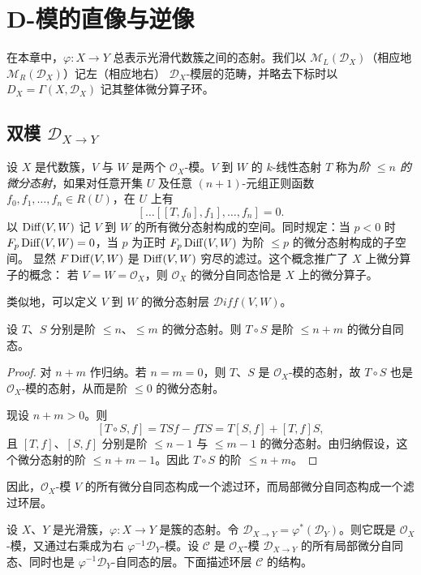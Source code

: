 \chapter{D-模的直像与逆像}

在本章中，$\varphi:X\to Y$ 总表示光滑代数簇之间的态射。我们以
$\mathcal{M}_L(\mathcal{D}_X)$（相应地 $\mathcal{M}_R(\mathcal{D}_X)$）记左（相应地右）
$\mathcal{D}_X$-模层的范畴，并略去下标时以 $D_X=\Gamma(X,\mathcal{D}_X)$ 记其整体微分算子环。

\section{双模 $\mathcal{D}_{X\to Y}$}

设 $X$ 是代数簇，$V$ 与 $W$ 是两个 $\mathcal{O}_X$-模。$V$ 到 $W$ 的 $k$-线性态射 $T$ 称为\emph{阶 $\le n$ 的微分态射}，如果对任意开集 $U$ 及任意 $(n+1)$-元组正则函数
$f_0,f_1,\dots,f_n\in R(U)$，在 $U$ 上有
$$[\dots[[T,f_0],f_1],\dots,f_n]=0.$$
以 $\operatorname{Diff}(V,W)$ 记 $V$ 到 $W$ 的所有微分态射构成的空间。同时规定：当 $p<0$ 时
$F_p\operatorname{Diff}(V,W)=0$，当 $p$ 为正时 $F_p\operatorname{Diff}(V,W)$ 为阶 $\le p$ 的微分态射构成的子空间。
显然 $F\operatorname{Diff}(V,W)$ 是 $\operatorname{Diff}(V,W)$ 穷尽的滤过。这个概念推广了 $X$ 上微分算子的概念：
若 $V=W=\mathcal{O}_X$，则 $\mathcal{O}_X$ 的微分自同态恰是 $X$ 上的微分算子。

类似地，可以定义 $V$ 到 $W$ 的微分态射层 $\mathcal{D}iff(V,W)$。

\begin{lemma}\label{lem:4.1.1}
设 $T$、$S$ 分别是阶 $\le n$、$\le m$ 的微分态射。则 $T\circ S$ 是阶 $\le n+m$ 的微分自同态。
\end{lemma}

\begin{proof}
对 $n+m$ 作归纳。若 $n=m=0$，则 $T$、$S$ 是 $\mathcal{O}_X$-模的态射，故 $T\circ S$ 也是
$\mathcal{O}_X$-模的态射，从而是阶 $\le 0$ 的微分态射。

现设 $n+m>0$。则
$$[T\circ S,f]=TSf-fTS=T[S,f]+[T,f]S,$$
且 $[T,f]$、$[S,f]$ 分别是阶 $\le n-1$ 与 $\le m-1$ 的微分态射。由归纳假设，这个微分态射的阶
$\le n+m-1$。因此 $T\circ S$ 的阶 $\le n+m$。
\end{proof}

因此，$\mathcal{O}_X$-模 $V$ 的所有微分自同态构成一个滤过环，而局部微分自同态构成一个滤过环层。

设 $X$、$Y$ 是光滑簇，$\varphi:X\to Y$ 是簇的态射。令
$\mathcal{D}_{X\to Y}=\varphi^*(\mathcal{D}_Y)$。则它既是 $\mathcal{O}_X$-模，又通过右乘成为右
$\varphi^{-1}\mathcal{D}_Y$-模。设 $\mathcal{C}$ 是 $\mathcal{O}_X$-模 $\mathcal{D}_{X\to Y}$ 的所有局部微分自同态、同时也是 $\varphi^{-1}\mathcal{D}_Y$-自同态的层。下面描述环层 $\mathcal{C}$ 的结构。

